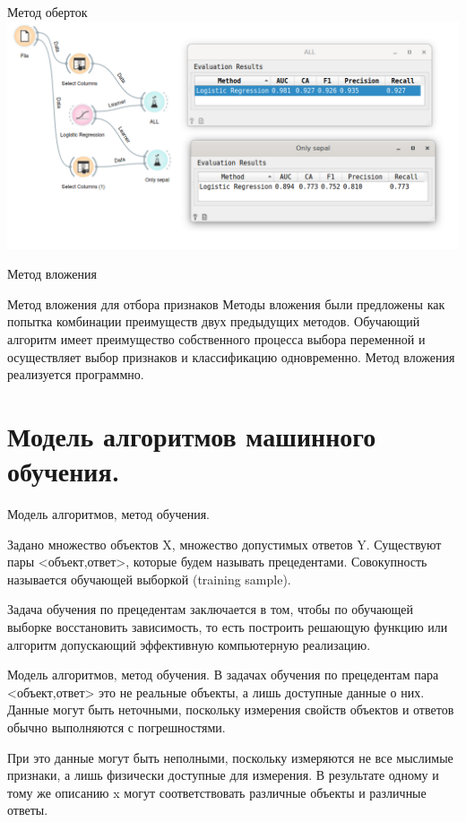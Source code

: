 \documentclass{beamer}
\begin{document}
  \begin{frame}{Метод оберток}
  \includegraphics[scale=0.4]{task07_02.png}
 \end{frame} 
 
\begin{frame}{Метод вложения}

Метод вложения для отбора признаков
Методы вложения были предложены как попытка комбинации преимуществ двух предыдущих методов. 
Обучающий алгоритм имеет преимущество 
собственного процесса выбора переменной и осуществляет выбор признаков и классификацию одновременно. 
Метод вложения реализуется программно. 
\end{frame}




\section{Модель алгоритмов машинного обучения.}

\begin{frame}{Модель алгоритмов, метод обучения.}

Задано множество объектов X, множество допустимых ответов Y. 
Существуют пары <объект,ответ>,  которые будем  называть прецедентами. 
Совокупность  называется обучающей выборкой (training sample).



Задача обучения по прецедентам заключается в том, чтобы по  обучающей выборке 
восстановить зависимость, то есть построить решающую функцию  или алгоритм допускающий эффективную компьютерную 
реализацию.

\end{frame}  

\begin{frame}{Модель алгоритмов, метод обучения.}
В задачах обучения по прецедентам  пара <объект,ответ> 
это не реальные объекты, а лишь доступные данные о них. 
Данные могут быть неточными, поскольку измерения  свойств объектов и ответов обычно
выполняются с погрешностями. 

При это данные могут быть неполными, 
поскольку измеряются не все мыслимые признаки, а лишь физически доступные для измерения.
В результате одному и тому же описанию x могут соответствовать различные объекты и различные ответы. 
\end{frame}  
\end{document}
